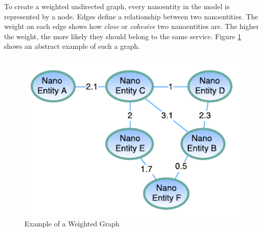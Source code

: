 \begin{minipage}[t]{0.6\textwidth}
	\setlength{\parskip}{5pt plus 0.1pt}	
	To create a weighted undirected graph, every nanoentity in the model is represented by a node. Edges define a relationship between two nanoentities. The weight on each edge shows how \textit{close} or \textit{cohesive} two nanoentities are. The higher the weight, the more likely they should belong to the same service. Figure \ref{fig:weighted_graph} shows an abstract example of such a graph.
\end{minipage}
\begin{minipage}[t]{0.4\textwidth}	
	\begin{figure}[H]
		\includegraphics[scale=0.8]{diagrams/weighted_graph.pdf}
		\caption{Example of a Weighted Graph}
		\label{fig:weighted_graph}
	\end{figure}
	
\end{minipage}

